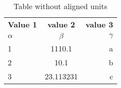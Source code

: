 \documentclass{article}
\begin{document}
 	\begin{table}[h!]
 		\begin{center}
 		\caption{Table without aligned units}
 		\label{tab:table1}
 		\begin{tabular}{l|c|r}
 			\textbf{Value 1} & \textbf{value 2} & \textbf{value 3}\\
 			$\alpha$ & $\beta$ & $\gamma$ \\
 			\hline
 1 & 1110.1 & a\\
 2 & 10.1 & b\\
 3 & 23.113231 & c\\
\end{tabular}
 		\end{center}
 	\end{table}
 
\end{document}
